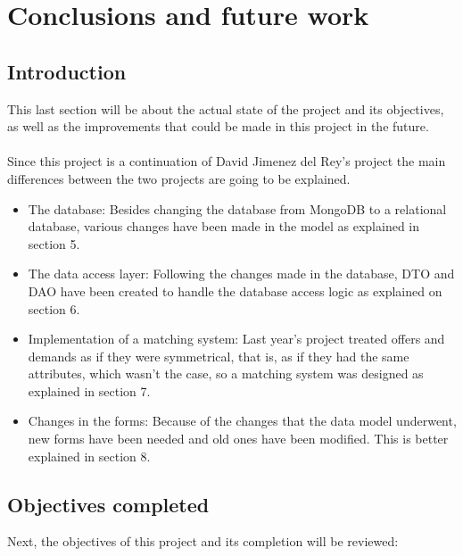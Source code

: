 \documentclass[11pt]{book}
\begin{document}
	
	\chapter{Conclusions and future work}
	\section{Introduction}
	This last section will be about the actual state of the project and its objectives, as well as the improvements that could be made in this project in the future.\\\\
	Since this project is a continuation of David Jimenez del Rey's project the main differences between the two projects are going to be explained.
	\begin{itemize}
		\item The database: Besides changing the database from MongoDB to a relational database, various changes have been made in the model as explained in section 5.
		\item The data access layer: Following the changes made in the database, DTO and DAO have been created to handle the database access logic as explained on section 6.
		\item Implementation of a matching system: Last year's project treated offers and demands as if they were symmetrical, that is, as if they had the same attributes, which wasn't the case, so a matching system was designed as explained in section 7.
		\item Changes in the forms: Because of the changes that the data model underwent, new forms have been needed and old ones have been modified. This is better explained in section 8.
	\end{itemize}
	
	\section{Objectives completed}
	Next, the objectives of this project and its completion will be reviewed:
	
\end{document}
